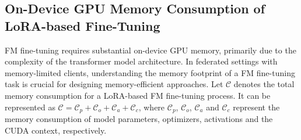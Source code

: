 \documentclass[sigconf]{acmart}
\begin{document}


\subsection{On-Device GPU Memory Consumption of LoRA-based Fine-Tuning}\label{sec:memory_consumption}
FM fine-tuning requires substantial on-device GPU memory, primarily due to the complexity of the transformer model architecture. In federated settings with memory-limited clients, understanding the memory footprint of a FM fine-tuning task is crucial for designing memory-efficient approaches. 
% 
% 
Let $\mathcal{C}$ denotes the total memory consumption for a LoRA-based FM fine-tuning process. It can be represented as $\mathcal{C}=\mathcal{C}_p+\mathcal{C}_o+\mathcal{C}_a+\mathcal{C}_c$, where $\mathcal{C}_p$, $\mathcal{C}_o$, $\mathcal{C}_a$ and $\mathcal{C}_c$ represent the memory consumption of model parameters, optimizers, activations and the CUDA context, respectively.
\end{document}

